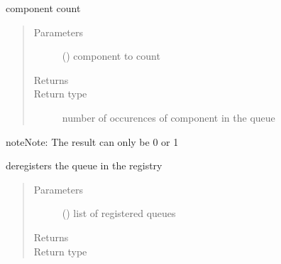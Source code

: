 \documentclass[letterpaper,10pt,english]{sphinxmanual}
\begin{document}
\begin{fulllineitems}
\begin{fulllineitems}
\end{fulllineitems}


\begin{fulllineitems}
\label{\detokenize{Reference:salabim.Queue.count}}
component count
\begin{quote}\begin{description}
\item[{Parameters}] \leavevmode
{} ({\hyperref[\detokenize{Reference:salabim.Component}]{}}) \textendash{} component to count

\item[{Returns}] \leavevmode


\item[{Return type}] \leavevmode
number of occurences of component in the queue

\end{description}\end{quote}

\begin{sphinxadmonition}{note}{Note:}
The result can only be 0 or 1
\end{sphinxadmonition}

\end{fulllineitems}


\begin{fulllineitems}
\label{\detokenize{Reference:salabim.Queue.deregister}}
deregisters the queue in the registry
\begin{quote}\begin{description}
\item[{Parameters}] \leavevmode
{} () \textendash{} list of registered queues

\item[{Returns}] \leavevmode
{}

\item[{Return type}] \leavevmode
{\hyperref[\detokenize{Reference:salabim.Queue}]{}}


\end{description}
\end{quote}
\end{fulllineitems}
\end{fulllineitems}
\end{document}

